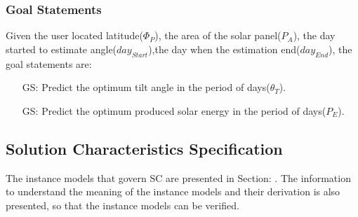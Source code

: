 \documentclass[12pt]{article}
\newcounter{goalnum} %
\begin{document}
\subsubsection{Goal Statements} \label{sec_GS}

\noindent Given the user located latitude($\Phi_{P}$), the area of the solar panel($P_A$), the day started to estimate angle($day_{Start}$),the day when the  estimation end($day_{End}$), the goal statements are:

\begin{itemize}

\item[GS\refstepcounter{goalnum}\thegoalnum \label{G_meaningfulLabel}:] Predict the optimum tilt angle in the period of days($\theta_{T}$).

\item[GS\refstepcounter{goalnum}\thegoalnum \label{G_meaningfulLabel}:] Predict the optimum produced solar energy in the period of days($P_{E}$).


\end{itemize}

\subsection{Solution Characteristics Specification} \label{sec_SCS}

The instance models that govern SC are presented in Section: . The
information to understand the meaning of the instance models and their derivation is also
presented, so that the instance models can be verified.


\iffalse{}
\end{document}
